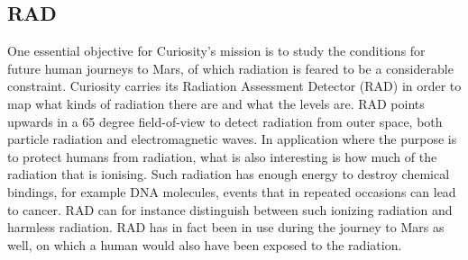 \subsection{RAD}
One essential objective for Curiosity's mission is to study the conditions for future human journeys to Mars, of which radiation is feared to be a considerable constraint.
Curiosity carries its Radiation Assessment Detector (RAD) in order to map what kinds of radiation there are and what the levels are.
RAD points upwards in a 65 degree field-of-view to detect radiation from outer space, both particle radiation and electromagnetic waves.
In application where the purpose is to protect humans from radiation, what is also interesting is how much of the radiation that is ionising.
Such radiation has enough energy to destroy chemical bindings, for example DNA molecules, events that in repeated occasions can lead to cancer.
RAD can for instance distinguish between such ionizing radiation and harmless radiation.
RAD has in fact been in use during the journey to Mars as well, on which a human would also have been exposed to the radiation. \cite{RAD}